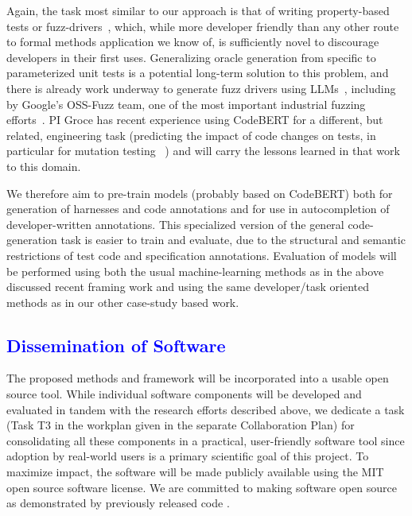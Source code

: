 Again, the task most similar to our approach is that of
writing property-based tests or fuzz-drivers~\cite{goldstein2022some},
which, while more developer friendly than any other route to formal
methods application we know of, is sufficiently novel to discourage
developers in their first uses.  Generalizing oracle
generation from specific to parameterized unit tests is a potential
long-term solution to this problem, and there is already work underway
to generate fuzz drivers using LLMs~\cite{zhang2023understanding},
including by Google's OSS-Fuzz team, one of the most important
industrial fuzzing efforts~\cite{ossfuzzllm}.  PI Groce has recent experience
using CodeBERT for a different, but related, engineering task
(predicting the impact of code changes on tests, in particular for
mutation testing ~\cite{ContextPMT}) and will carry the lessons learned in that work to
this domain.

We therefore aim to pre-train models (probably based on CodeBERT) both
for generation of harnesses and code annotations and for use in
autocompletion of developer-written annotations.  This specialized
version of the general code-generation task is easier to train and
evaluate, due to the structural and semantic restrictions of test code
and specification annotations.  Evaluation of models will be performed
using both the usual machine-learning methods as in the above
discussed recent framing work and using the same
developer/task oriented methods as in our other case-study based work.

\subsection{\textcolor{blue}{Dissemination of Software}}
\label{sec:software}

The proposed methods and framework will be incorporated into a usable
open source tool.
While individual software components will be developed and evaluated
in tandem with the research efforts described above, we dedicate a
task (Task T3 in the workplan given in the separate Collaboration Plan) for consolidating all
these components in a practical, user-friendly software tool since
adoption by real-world users is a primary scientific goal of this project.
To maximize impact, the software will be made publicly available %
using the MIT open source software license.
We are committed to making software open source as demonstrated by previously released %
code \cite{mleplussoftware, bernalMLEToolIntegrated2012a, openbuildnetsoftware, nghiemOpenBuildNetFrameworkDistributed2016}.


